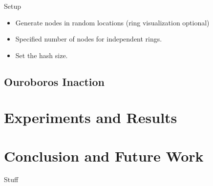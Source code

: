 \documentclass{beamer}
\begin{document}
\begin{frame}{Setup}
	\begin{itemize}
		\item Generate nodes in random locations (ring visualization optional)
		\item Specified number of nodes for independent rings. 
		\item Set the hash size.
	\end{itemize}
\end{frame}

\subsection{Ouroboros Inaction}



\section{Experiments and Results}


\section{Conclusion and Future Work}

\begin{frame}{Stuff}

\end{frame}
\end{document}
